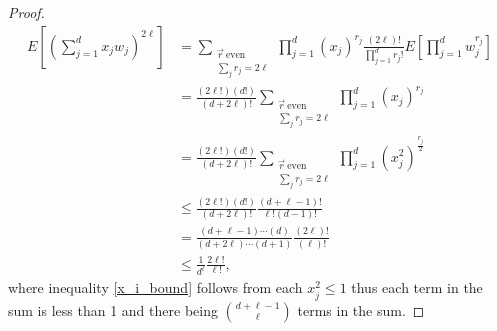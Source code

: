 \documentclass{article}
\numberwithin{equation}{section}
\theoremstyle{Lemma}
\theoremstyle{Corollary}
\theoremstyle{Theorem}
\theoremstyle{Remark}
\begin{document}
\begin{proof}
\begin{align}
    E[(\sum_{j=1}^{d}x_{j}w_{j})^{2\ell}]&= \sum_{\substack{\vec{r}~\text{even} \\\sum_{j}r_{j}=2\ell}}\prod_{j=1}^{d}(x_{j})^{r_{j}}\frac{(2\ell)!}{\prod_{j=1}^{d}r_{j}!}E[\prod_{j=1}^{d}w_{j}^{r_{j}}]\\
    &= \frac{(2\ell!)(d!)}{(d+2\ell)!}\sum_{\substack{\vec{r}~\text{even} \\\sum_{j}r_{j}=2\ell}}\prod_{j=1}^{d}(x_{j})^{r_{j}}\\
    &=\frac{(2\ell!)(d!)}{(d+2\ell)!}\sum_{\substack{\vec{r}~\text{even} \\\sum_{j}r_{j}=2\ell}}\prod_{j=1}^{d}(x_{j}^{2})^{\frac{r_{j}}{2}}\\
    &\leq \frac{(2\ell!)(d!)}{(d+2\ell)!} \frac{(d+\ell-1)!}{\ell!(d-1)!} \label{x_i_bound}\\
    &=\frac{(d+\ell-1)\cdots(d)}{(d+2\ell)\cdots(d+1)}\frac{(2\ell)!}{(\ell)!}\\
    &\leq  \frac{1}{d^{\ell}}\frac{2\ell!}{\ell!},
\end{align}
where inequality \eqref{x_i_bound} follows from each $x_{j}^{2} \leq 1$ thus each term in the sum is less than 1 and there being $\binom{d+\ell-1}{\ell}$ terms in the sum.


\end{proof}
\end{document}
